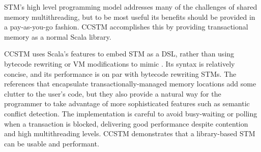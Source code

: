 
STM's high level programming model addresses many of the challenges of
shared memory multithreading, but to be most useful its benefits should
be provided in a pay-as-you-go fashion.  CCSTM accomplishes this by
providing transactional memory as a normal Scala library.

CCSTM uses Scala's features to embed STM as a DSL, rather than using
bytecode rewriting or VM modifications to mimic .
Its syntax is relatively concise, and its performance is on par
with bytecode rewriting STMs.  The references that encapsulate
transactionally-managed memory locations add some clutter to the user's
code, but they also provide a natural way for the programmer to take
advantage of more sophisticated features such as semantic conflict
detection.  The implementation is careful to avoid busy-waiting or
polling when a transaction is blocked, delivering good performance
despite contention and high multithreading levels.  CCSTM demonstrates
that a library-based STM can be usable and performant.

